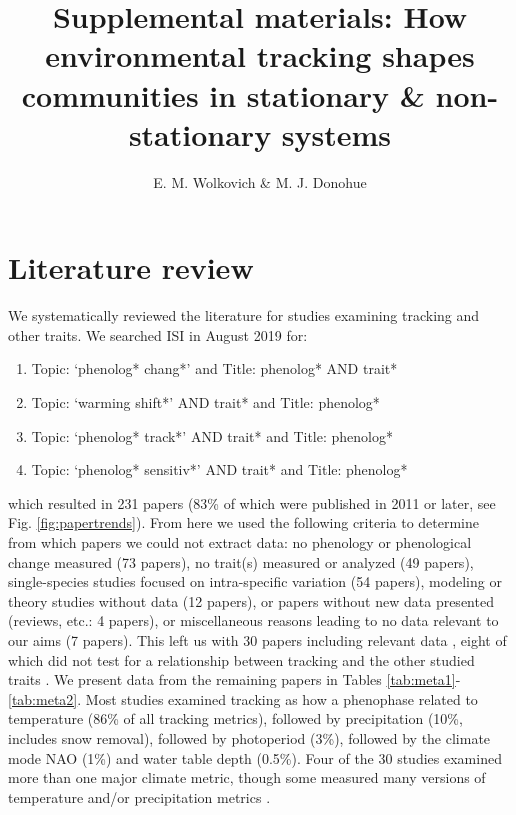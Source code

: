 \documentclass[11pt,letter]{article}
\begin{document}
\renewcommand{\refname}{\CHead{}}

\title{Supplemental materials:  How environmental tracking shapes communities in stationary \& non-stationary systems} 

\author{E. M. Wolkovich \& M. J. Donohue}
\date{} 
\maketitle  %
\renewcommand{\thetable}{S\arabic{table}}
\renewcommand{\thefigure}{S\arabic{figure}}

\section{Literature review}
We systematically reviewed the literature for studies examining tracking and other traits. We searched ISI in August 2019 for:
\begin{enumerate}
\item Topic: `phenolog* chang*' and Title: phenolog* AND trait*
\item Topic: `warming shift*' AND trait* and Title: phenolog*
\item Topic: `phenolog* track*' AND trait* and Title: phenolog*
\item Topic: `phenolog* sensitiv*' AND trait* and Title: phenolog*
\end{enumerate}
which resulted in 231 papers (83\% of which were published in 2011 or later, see Fig. \ref{fig:papertrends}). From here we used the following criteria to determine from which papers we could not extract data: no phenology or phenological change measured (73 papers), no trait(s) measured or analyzed (49 papers), single-species studies focused on intra-specific variation (54 papers), modeling or theory studies without data (12 papers), or papers without new data presented (reviews, etc.: 4 papers), or miscellaneous reasons leading to no data relevant to our aims (7 papers). This left us with 30 papers including relevant data \citep{Suzuki:1997gf,Post1999,adrian2006,Xu:2009an,Goodenough2010,Diamond:2011nx,Moussus2011,Szilvia2012,Dorji2013,Ishioka2013,xia2013,Bock2014,kharouba2014,Vegvari2015,bell2015,lasky2016,McDermott2016,Zhu2016BioLetters,brooks2017,du2017,munson2017,arfinkhan2018,zhang2018,Ladwig2019,park2019,sharma2019,Xavier2019,Zettlemoyer2019}, eight of which did not test for a relationship between tracking and the other studied traits \citep{Suzuki:1997gf,adrian2006,Xu:2009an,bell2015,McDermott2016,Sherwood2017,sharma2019,Xavier2019}. We present data from the remaining papers in Tables \ref{tab:meta1}-\ref{tab:meta2}. Most studies examined tracking as how a phenophase related to temperature (86\% of all tracking metrics), followed by precipitation (10\%, includes snow removal), followed by photoperiod (3\%), followed by the climate mode NAO (1\%) and water table depth (0.5\%). Four of the 30 studies examined more than one major climate metric, though some measured many versions of temperature and/or precipitation metrics \citep[e.g., 15 precipitation and/or temperature metrics considered in][]{munson2017}.
\end{document}
